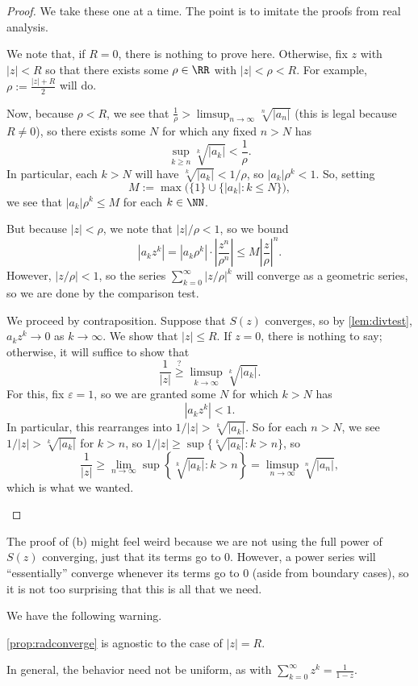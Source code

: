 \begin{proof}
	We take these one at a time. The point is to imitate the proofs from real analysis.
	\begin{listalph}
		\item We note that, if $R=0$, there is nothing to prove here. Otherwise, fix $z$ with $|z|<R$ so that there exists some $\rho\in\RR$ with $|z|<\rho<R$. For example, $\rho:=\frac{|z|+R}2$ will do.

		Now, because $\rho<R$, we see that $\frac1\rho>\limsup_{n\to\infty}\sqrt[n]{|a_n|}$ (this is legal because $R\ne0$), so there exists some $N$ for which any fixed $n>N$ has
		\[\sup_{k\ge n}\sqrt[k]{|a_k|}<\frac1\rho.\]
		In particular, each $k>N$ will have $\sqrt[k]{|a_k|}<1/\rho$, so $|a_k|\rho^k<1$. So, setting
		\[M:=\max\big(\{1\}\cup\{|a_k|:k\le N\}\big),\]
		we see that $|a_k|\rho^k\le M$ for each $k\in\NN$.
		
		But because $|z|<\rho$, we note that $|z|/\rho<1$, so we bound
		\[\left|a_kz^k\right|=\left|a_k\rho^k\right|\cdot\left|\frac{z^n}{\rho^n}\right|\le M\left|\frac z\rho\right|^n.\]
		However, $|z/\rho|<1$, so the series $\sum_{k=0}^\infty|z/\rho|^k$ will converge as a geometric series, so we are done by the comparison test.

		\item We proceed by contraposition. Suppose that $S(z)$ converges, so by \autoref{lem:divtest}, $a_kz^k\to0$ as $k\to\infty$. We show that $|z|\le R$. If $z=0$, there is nothing to say; otherwise, it will suffice to show that
		\[\frac1{|z|}\stackrel?\ge\limsup_{k\to\infty}\sqrt[k]{|a_k|}.\]
		For this, fix $\varepsilon=1$, so we are granted some $N$ for which $k>N$ has
		\[\left|a_kz^k\right|<1.\]
		In particular, this rearranges into $1/|z|>\sqrt[k]{|a_k|}$. So for each $n>N$, we see $1/|z|>\sqrt[k]{|a_k|}$ for $k>n$, so $1/|z|\ge\sup\{\sqrt[k]{|a_k|}:k>n\}$, so
		\[\frac1{|z|}\ge\lim_{n\to\infty}\sup\left\{\sqrt[k]{|a_k|}:k>n\right\}=\limsup_{n\to\infty}\sqrt[n]{|a_n|},\]
		which is what we wanted.
		\qedhere
	\end{listalph}
\end{proof}
\begin{remark}[Nir]
	The proof of (b) might feel weird because we are not using the full power of $S(z)$ converging, just that its terms go to $0$. However, a power series will ``essentially'' converge whenever its terms go to $0$ (aside from boundary cases), so it is not too surprising that this is all that we need.
\end{remark}
We have the following warning.
\begin{warn}
	\autoref{prop:radconverge} is agnostic to the case of $|z|=R$.
\end{warn}
In general, the behavior need not be uniform, as with $\sum_{k=0}^\infty z^k=\frac1{1-z}$.

